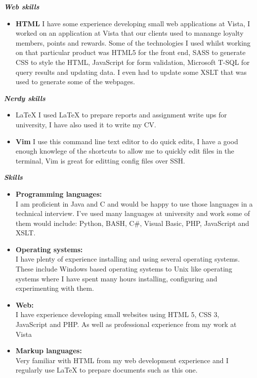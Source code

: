\documentclass{res}
\begin{document}
\begin{resume}
\begin{itemize}
\end{itemize}
\vspace{8pt}
{\sl \textbf{Web skills}}
\vspace{8pt}
\begin{itemize}
	\item \textbf{HTML} I have some experience developing small web applications at Vista, I worked on an application at Vista that our clients used to manange loyalty members, points and rewards. Some of the technologies I used whilst working on that particular product was HTML5 for the front end, SASS to generate CSS to style the HTML, JavaScript for form validation, Microsoft T-SQL for query results and updating data. I even had to update some XSLT that was used to generate some of the webpages.
\end{itemize}
\vspace{8pt}
{\sl \textbf{Nerdy skills}}
\begin{itemize}
	\item \LaTeX{} I used \LaTeX{} to prepare reports and assignment write ups for university, I have also used it to write my CV.
	\item \textbf{Vim} I use this command line text editor to do quick edits, I have a good enough knowlege of the shortcuts to allow me to quickly edit files in the terminal, Vim is great for editting config files over SSH.
\end{itemize}
{\sl \textbf{Skills}}
  
   \begin{itemize} \itemsep -2pt %
   \item \textbf{Programming languages:} \\ \hfill I am proficient in Java and C and would be happy to use those languages in a technical interview.
   I've used many languages at university and work some of them would include: Python, BASH, C\#, Visual Basic, PHP, JavaScript and XSLT. 
   \item \textbf{Operating systems:} \\ \hfill I have plenty of experience installing and using several operating systems. These include Windows based operating systems to Unix like operating systems where I have spent many hours installing, configuring and experimenting with them.
   \item \textbf{Web:} \\ \hfill I have experience developing small websites using HTML 5, CSS 3, JavaScript and PHP.
   As well as professional experience from my work at Vista
   \item \textbf{Markup languages:} \\ Very familiar with HTML from my web development experience and I regularly use \LaTeX{} to prepare documents such as this one.


\end{itemize}
\end{resume}
\end{document}
